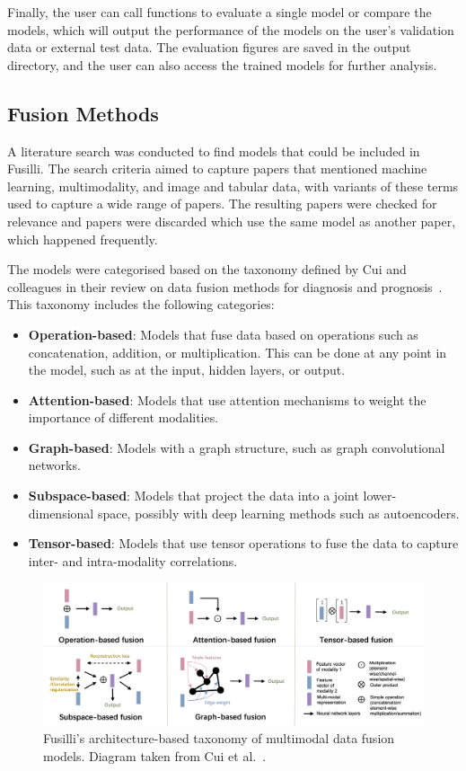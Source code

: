 Finally, the user can call functions to evaluate a single model or compare the models, which will output the performance of the models on the user's validation data or external test data.
The evaluation figures are saved in the output directory, and the user can also access the trained models for further analysis.

\subsection{Fusion Methods}

A literature search was conducted to find models that could be included in Fusilli.
The search criteria aimed to capture papers that mentioned machine learning, multimodality, and image and tabular data, with variants of these terms used to capture a wide range of papers.
The resulting papers were checked for relevance and papers were discarded which use the same model as another paper, which happened frequently.

The models were categorised based on the taxonomy defined by Cui and colleagues in their review on data fusion methods for diagnosis and prognosis~\cite{cuiDeepMultimodalFusion2022}.
This taxonomy includes the following categories:
\begin{itemize}
\setlength\itemsep{-0.5em}
    \item \textbf{Operation-based}: Models that fuse data based on operations such as concatenation, addition, or multiplication.
    This can be done at any point in the model, such as at the input, hidden layers, or output.
    \item \textbf{Attention-based}: Models that use attention mechanisms to weight the importance of different modalities.
    \item \textbf{Graph-based}: Models with a graph structure, such as graph convolutional networks.
    \item \textbf{Subspace-based}: Models that project the data into a joint lower-dimensional space, possibly with deep learning methods such as autoencoders.
    \item \textbf{Tensor-based}: Models that use tensor operations to fuse the data to capture inter- and intra-modality correlations.
\end{itemize}

\begin{figure}[h]
    \centering
    \includegraphics[width=\textwidth]{figures/cui_diagram}
    \caption{Fusilli's architecture-based taxonomy of multimodal data fusion models. Diagram taken from Cui et al.~\cite{cuiDeepMultimodalFusion2022}.}
    \label{fig:fusilli_taxonomy}
\end{figure}


